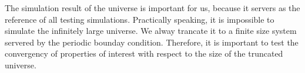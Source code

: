 \documentclass[aip,jcp,a4paper,reprint,onecolumn]{revtex4-1}
\begin{document}
The simulation result of the universe is important
for us, because it servers as the reference of all testing simulations.
Practically speaking, it is impossible to simulate the infinitely large
universe. We alway trancate it to a finite size system servered
by the periodic bounday condition. Therefore, it is important to
test the convergency of properties of interest with respect to the
size of the truncated universe.
\end{document}
